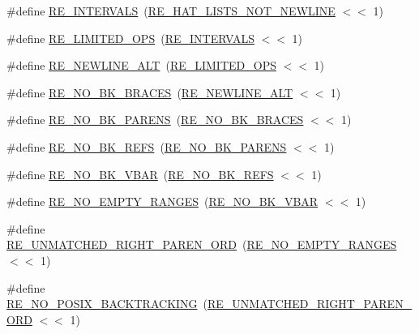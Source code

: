 \begin{DoxyCompactItemize}
\item 
\#define \hyperlink{a00092_a377bd32fc62adedc890f74cd18845aa9}{R\+E\+\_\+\+I\+N\+T\+E\+R\+V\+A\+LS}~(\hyperlink{a00092_aad6ec0e3f8f0bb3c53213e3f9ca77d8e}{R\+E\+\_\+\+H\+A\+T\+\_\+\+L\+I\+S\+T\+S\+\_\+\+N\+O\+T\+\_\+\+N\+E\+W\+L\+I\+NE} $<$$<$ 1)
\item 
\#define \hyperlink{a00092_a0782bb31ad7160085c33f13dca7e369f}{R\+E\+\_\+\+L\+I\+M\+I\+T\+E\+D\+\_\+\+O\+PS}~(\hyperlink{a00092_a377bd32fc62adedc890f74cd18845aa9}{R\+E\+\_\+\+I\+N\+T\+E\+R\+V\+A\+LS} $<$$<$ 1)
\item 
\#define \hyperlink{a00092_a7a69bf315a61cb9d674332a6a5d64819}{R\+E\+\_\+\+N\+E\+W\+L\+I\+N\+E\+\_\+\+A\+LT}~(\hyperlink{a00092_a0782bb31ad7160085c33f13dca7e369f}{R\+E\+\_\+\+L\+I\+M\+I\+T\+E\+D\+\_\+\+O\+PS} $<$$<$ 1)
\item 
\#define \hyperlink{a00092_a924b9782a779a0db37e3c858967d60af}{R\+E\+\_\+\+N\+O\+\_\+\+B\+K\+\_\+\+B\+R\+A\+C\+ES}~(\hyperlink{a00092_a7a69bf315a61cb9d674332a6a5d64819}{R\+E\+\_\+\+N\+E\+W\+L\+I\+N\+E\+\_\+\+A\+LT} $<$$<$ 1)
\item 
\#define \hyperlink{a00092_af2f17f18a9c771c91d963f466f559e68}{R\+E\+\_\+\+N\+O\+\_\+\+B\+K\+\_\+\+P\+A\+R\+E\+NS}~(\hyperlink{a00092_a924b9782a779a0db37e3c858967d60af}{R\+E\+\_\+\+N\+O\+\_\+\+B\+K\+\_\+\+B\+R\+A\+C\+ES} $<$$<$ 1)
\item 
\#define \hyperlink{a00092_aed01be95fde1250190b37b7788af5f35}{R\+E\+\_\+\+N\+O\+\_\+\+B\+K\+\_\+\+R\+E\+FS}~(\hyperlink{a00092_af2f17f18a9c771c91d963f466f559e68}{R\+E\+\_\+\+N\+O\+\_\+\+B\+K\+\_\+\+P\+A\+R\+E\+NS} $<$$<$ 1)
\item 
\#define \hyperlink{a00092_a834997e69569c41f0394d6ee120051a0}{R\+E\+\_\+\+N\+O\+\_\+\+B\+K\+\_\+\+V\+B\+AR}~(\hyperlink{a00092_aed01be95fde1250190b37b7788af5f35}{R\+E\+\_\+\+N\+O\+\_\+\+B\+K\+\_\+\+R\+E\+FS} $<$$<$ 1)
\item 
\#define \hyperlink{a00092_ae01c1dfed60f209c2f10f252c3acf9fd}{R\+E\+\_\+\+N\+O\+\_\+\+E\+M\+P\+T\+Y\+\_\+\+R\+A\+N\+G\+ES}~(\hyperlink{a00092_a834997e69569c41f0394d6ee120051a0}{R\+E\+\_\+\+N\+O\+\_\+\+B\+K\+\_\+\+V\+B\+AR} $<$$<$ 1)
\item 
\#define \hyperlink{a00092_af1907a994cab6bd73ad14677b126a64b}{R\+E\+\_\+\+U\+N\+M\+A\+T\+C\+H\+E\+D\+\_\+\+R\+I\+G\+H\+T\+\_\+\+P\+A\+R\+E\+N\+\_\+\+O\+RD}~(\hyperlink{a00092_ae01c1dfed60f209c2f10f252c3acf9fd}{R\+E\+\_\+\+N\+O\+\_\+\+E\+M\+P\+T\+Y\+\_\+\+R\+A\+N\+G\+ES} $<$$<$ 1)
\item 
\#define \hyperlink{a00092_a35cf160909ead17ad6599238a2ebdd58}{R\+E\+\_\+\+N\+O\+\_\+\+P\+O\+S\+I\+X\+\_\+\+B\+A\+C\+K\+T\+R\+A\+C\+K\+I\+NG}~(\hyperlink{a00092_af1907a994cab6bd73ad14677b126a64b}{R\+E\+\_\+\+U\+N\+M\+A\+T\+C\+H\+E\+D\+\_\+\+R\+I\+G\+H\+T\+\_\+\+P\+A\+R\+E\+N\+\_\+\+O\+RD} $<$$<$ 1)

\end{DoxyCompactItemize}
